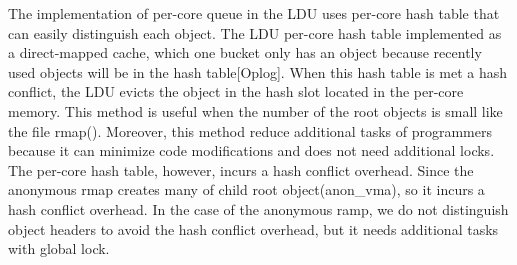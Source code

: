 The implementation of per-core queue in the LDU uses per-core hash table that 
can easily distinguish each object.
The LDU per-core hash table implemented as a direct-mapped cache, which one
bucket only has an object because recently used objects will be in the hash
table[Oplog].
When this hash table is met a hash conflict, the LDU evicts the object in the
hash slot located in the per-core memory.
This method is useful when the number of the root objects is small like the file
rmap().
Moreover, this method reduce additional tasks of programmers because it can
minimize code modifications and does not need additional locks.
The per-core hash table, however, incurs a hash conflict overhead.
Since the anonymous rmap creates many of child root object(anon\_vma), so it
incurs a hash conflict overhead.
In the case of the anonymous ramp, we do not distinguish object headers to
avoid the hash conflict overhead, but it needs additional tasks with global
lock.
